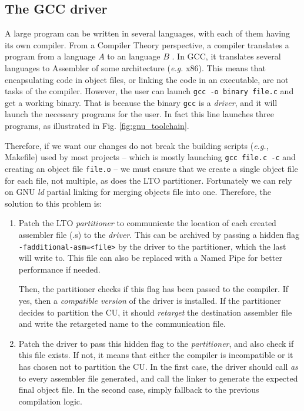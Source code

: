 \documentclass[runningheads]{llncs}
\begin{document}
\subsection{The GCC driver}\label{sec:gcc_driver}

A large program can be written in several languages, with each of them having
its own compiler. From a Compiler Theory perspective, a compiler
translates a program from a language $A$ to an language $B$
\cite{dragonbook}. In GCC, it translates several languages to Assembler
of some architecture (\textit{e.g.} x86). This means that
encapsulating code in object files, or linking the code in an executable, are
not tasks of the compiler. However, the user can launch \texttt{gcc -o binary
file.c} and get a working binary. That is because the binary \texttt{gcc} is
a \textit{driver}, and it will launch the
necessary programs for the user. In fact this line launches three programs,
as illustrated in Fig. \ref{fig:gnu_toolchain}.

Therefore, if we want our changes do not break the building scripts
(\textit{e.g.}, Makefile) used by most
projects -- which is mostly launching \texttt{gcc file.c -c} and creating an object file \texttt{file.o} -- we must ensure that we create a single object file for each file,
not multiple, as does the LTO partitioner. Fortunately we can rely on GNU \textit{ld}
partial linking for merging objects file into one. Therefore, the solution to this problem
is:
\begin{enumerate}
	\item Patch the LTO \textit{partitioner} to communicate the location of
	each created assembler file (.s) to the \textit{driver}. This can be
	archived by passing a hidden flag \texttt{-fadditional-asm=<file>}
	by the driver to the partitioner, which the last will write to. This file can also
	be replaced with a Named Pipe for better performance if needed.

	Then, the partitioner checks if this flag has been passed to the compiler.
	If yes, then a \textit{compatible version} of the driver is installed. If
	the partitioner decides to partition the CU, it should \textit{retarget}
	the destination assembler file and write the retargeted name to the
	communication file.

	\item Patch the driver to pass this hidden flag to the
	\textit{partitioner}, and also check if this file exists. If not, it means
	that either the compiler is incompatible or it has chosen not to partition
	the CU. In the first case, the driver should call \textit{as} to every
	assembler file generated, and call the linker to generate the expected
	final object file. In the second case, simply fallback to the previous
	compilation logic.
\end{enumerate}
\end{document}
